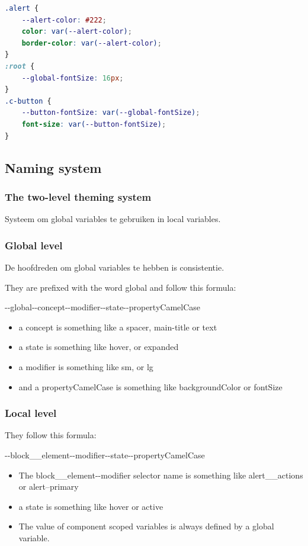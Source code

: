 \documentclass{article}
\begin{document}
\begin{lstlisting}[language=CSS]
.alert {
    --alert-color: #222;
    color: var(--alert-color);
    border-color: var(--alert-color);
}
:root {
    --global-fontSize: 16px;
}
.c-button {
    --button-fontSize: var(--global-fontSize);
    font-size: var(--button-fontSize);
}
\end{lstlisting}


\subsection{Naming system}

\subsubsection{The two-level theming system}

Systeem om global variables te gebruiken in local variables.

\subsubsection{Global level}

De hoofdreden om global variables te hebben is consistentie.

They are prefixed with the word global and follow this formula:

-{}-global-{}-concept-{}-modifier-{}-state-{}-propertyCamelCase

\begin{itemize}
    \item a concept is something like a spacer, main-title or text
    \item a state is something like hover, or expanded
    \item a modifier is something like sm, or lg
    \item and a propertyCamelCase is something like backgroundColor or fontSize
\end{itemize}

\subsubsection{Local level}

They follow this formula: 

-{}-block\_\_element-{}-modifier-{}-state-{}-propertyCamelCase

\begin{itemize}
    \item The block\_\_element-{}-modifier selector name is something like alert\_\_actions or alert--primary
    \item a state is something like hover or active
    \item The value of component scoped variables is always defined by a global variable.
\end{itemize}
\end{document}
